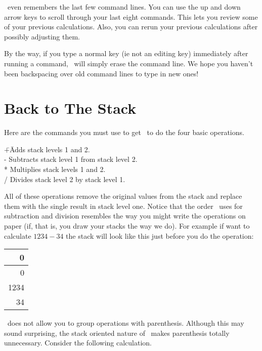 \CLAC\ even remembers the last few command lines. You can use the up and down arrow keys to
scroll through your last eight commands. This lets you review some of your previous
calculations. Also, you can rerun your previous calculations after possibly adjusting them.

By the way, if you type a normal key (ie not an editing key) immediately after running a
command, \CLAC\ will simply erase the command line. We hope you haven't been backspacing over
old command lines to type in new ones!

\section{Back to The Stack}

Here are the commands you must use to get \CLAC\ to do the four basic operations.

\begin{tabbing}
\hspace*{3em}\=+\hspace{3em}\=Adds stack levels 1 and 2.\\
\>             -\>            Subtracts stack level 1 from stack level 2.\\
\>             *\>            Multiplies stack levels 1 and 2.\\
\>             /\>            Divides stack level 2 by stack level 1.\\
\end{tabbing}

All of these operations remove the original values from the stack and replace them with the
single result in stack level one. Notice that the order \CLAC\ uses for subtraction and division
resembles the way you might write the operations on paper (if, that is, you draw your stacks the
way we do). For example if want to calculate $1234 - 34$ the stack will look like this just
before you do the operation:

\begin{tabular}{|r|} \hline
    0 \\ \hline
    0 \\ \hline
 1234 \\ \hline
   34 \\ \hline
\end{tabular}

\CLAC\ does not allow you to group operations with parenthesis. Although this may sound
surprising, the stack oriented nature of \CLAC\ makes parenthesis totally unnecessary. Consider
the following calculation.

